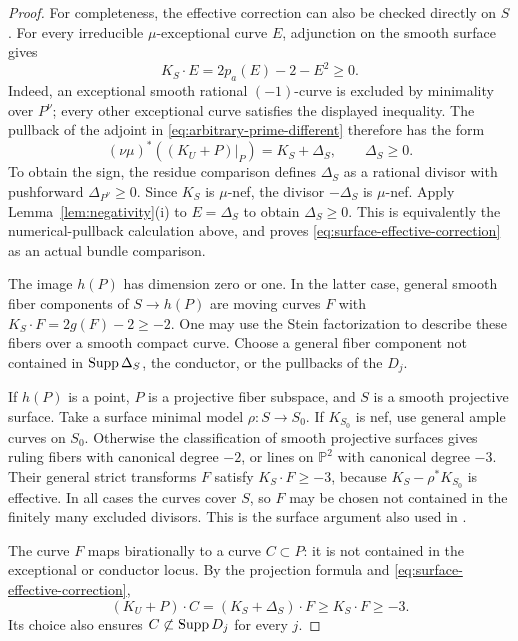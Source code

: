 \begin{proof}
For completeness, the effective correction can also be checked directly
on $S$.  For every irreducible $\mu$-exceptional curve $E$, adjunction on
the smooth surface gives
\[
 K_S\cdot E=2p_a(E)-2-E^2\geq0.
\]
Indeed, an exceptional smooth rational $(-1)$-curve is excluded by
minimality over $P^\nu$; every other exceptional curve satisfies the
displayed inequality.  The pullback of the adjoint in
\eqref{eq:arbitrary-prime-different} therefore has the form
\begin{equation}\label{eq:surface-effective-correction}
 (\nu\mu)^*((K_U+P)|_P)=K_S+\Delta_S,
 \qquad \Delta_S\geq0.
\end{equation}
To obtain the sign, the residue comparison defines $\Delta_S$ as a rational
divisor with pushforward $\Delta_{P^\nu}\geq0$.  Since $K_S$ is
$\mu$-nef, the divisor $-\Delta_S$ is $\mu$-nef.  Apply
Lemma~\ref{lem:negativity}\textup{(i)} to $E=\Delta_S$ to obtain
$\Delta_S\geq0$.  This is equivalently the
numerical-pullback calculation above, and proves
\eqref{eq:surface-effective-correction} as an actual bundle comparison.

The image $h(P)$ has dimension zero or one.  In the latter case, general
smooth fiber components of $S\to h(P)$ are moving curves $F$ with
$K_S\cdot F=2g(F)-2\geq-2$.  One may use the Stein factorization to
describe these fibers over a smooth compact curve.  Choose a general fiber
component not contained in $\operatorname{Supp}\Delta_S$, the conductor, or the
pullbacks of the $D_j$.

If $h(P)$ is a point, $P$ is a projective fiber subspace, and $S$ is a
smooth projective surface.  Take a surface minimal model $\rho:S\to S_0$.
If $K_{S_0}$ is nef, use general ample curves on $S_0$.  Otherwise the
classification of smooth projective surfaces gives ruling fibers with
canonical degree $-2$, or lines on $\mathbb P^2$ with canonical degree
$-3$.  Their general strict transforms $F$ satisfy $K_S\cdot F\geq-3$,
because $K_S-\rho^*K_{S_0}$ is effective.  In all cases the curves cover
$S$, so $F$ may be chosen not contained in the finitely many excluded
divisors.  This is the surface argument also used in
\cite[Lemma~3.3]{CT2023}.

The curve $F$ maps birationally to a curve $C\subset P$: it is not
contained in the exceptional or conductor locus.  By the projection
formula and \eqref{eq:surface-effective-correction},
\[
 (K_U+P)\cdot C=(K_S+\Delta_S)\cdot F
                  \geq K_S\cdot F\geq-3.
\]
Its choice also ensures $C\not\subset\operatorname{Supp} D_j$ for every $j$.
\end{proof}

